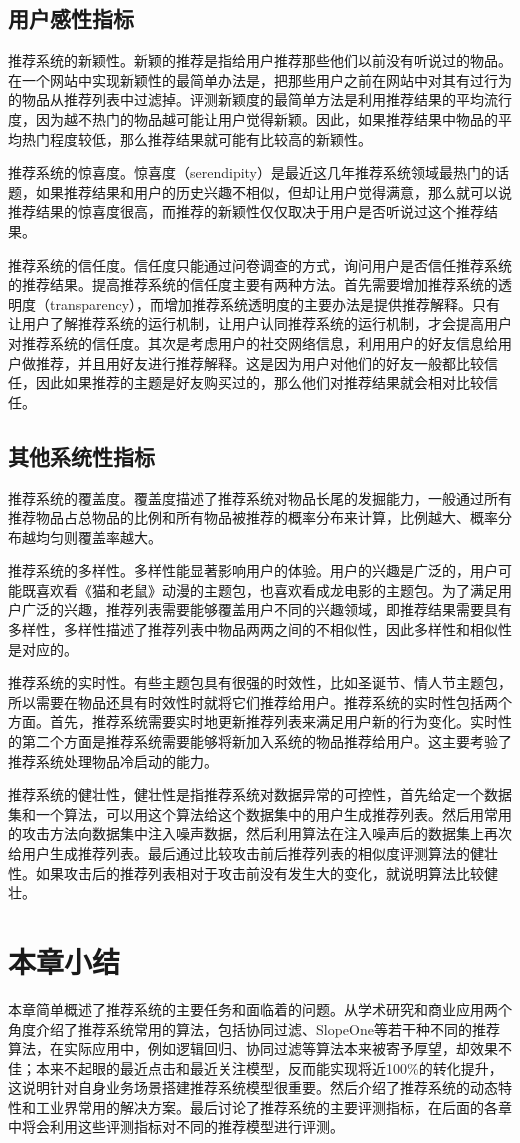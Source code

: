 		\subsection{用户感性指标}
			推荐系统的新颖性。新颖的推荐是指给用户推荐那些他们以前没有听说过的物品。在一个网站中实现新颖性的最简单办法是，把那些用户之前在网站中对其有过行为的物品从推荐列表中过滤掉。评测新颖度的最简单方法是利用推荐结果的平均流行度，因为越不热门的物品越可能让用户觉得新颖。因此，如果推荐结果中物品的平均热门程度较低，那么推荐结果就可能有比较高的新颖性。

			推荐系统的惊喜度。惊喜度（serendipity）是最近这几年推荐系统领域最热门的话题，如果推荐结果和用户的历史兴趣不相似，但却让用户觉得满意，那么就可以说推荐结果的惊喜度很高，而推荐的新颖性仅仅取决于用户是否听说过这个推荐结果。

			推荐系统的信任度。信任度只能通过问卷调查的方式，询问用户是否信任推荐系统的推荐结果。提高推荐系统的信任度主要有两种方法。首先需要增加推荐系统的透明度（transparency），而增加推荐系统透明度的主要办法是提供推荐解释。只有让用户了解推荐系统的运行机制，让用户认同推荐系统的运行机制，才会提高用户对推荐系统的信任度。其次是考虑用户的社交网络信息，利用用户的好友信息给用户做推荐，并且用好友进行推荐解释。这是因为用户对他们的好友一般都比较信任，因此如果推荐的主题是好友购买过的，那么他们对推荐结果就会相对比较信任。

		\subsection{其他系统性指标}
			推荐系统的覆盖度。覆盖度描述了推荐系统对物品长尾的发掘能力，一般通过所有推荐物品占总物品的比例和所有物品被推荐的概率分布来计算，比例越大、概率分布越均匀则覆盖率越大。

			推荐系统的多样性。多样性能显著影响用户的体验。用户的兴趣是广泛的，用户可能既喜欢看《猫和老鼠》动漫的主题包，也喜欢看成龙电影的主题包。为了满足用户广泛的兴趣，推荐列表需要能够覆盖用户不同的兴趣领域，即推荐结果需要具有多样性，多样性描述了推荐列表中物品两两之间的不相似性，因此多样性和相似性是对应的。

			推荐系统的实时性。有些主题包具有很强的时效性，比如圣诞节、情人节主题包，所以需要在物品还具有时效性时就将它们推荐给用户。推荐系统的实时性包括两个方面。首先，推荐系统需要实时地更新推荐列表来满足用户新的行为变化。实时性的第二个方面是推荐系统需要能够将新加入系统的物品推荐给用户。这主要考验了推荐系统处理物品冷启动的能力。

			推荐系统的健壮性，健壮性是指推荐系统对数据异常的可控性，首先给定一个数据集和一个算法，可以用这个算法给这个数据集中的用户生成推荐列表。然后用常用的攻击方法向数据集中注入噪声数据，然后利用算法在注入噪声后的数据集上再次给用户生成推荐列表。最后通过比较攻击前后推荐列表的相似度评测算法的健壮性。如果攻击后的推荐列表相对于攻击前没有发生大的变化，就说明算法比较健壮。

	\section{本章小结}
	本章简单概述了推荐系统的主要任务和面临着的问题。从学术研究和商业应用两个角度介绍了推荐系统常用的算法，包括协同过滤、SlopeOne等若干种不同的推荐算法，在实际应用中，例如逻辑回归、协同过滤等算法本来被寄予厚望，却效果不佳；本来不起眼的最近点击和最近关注模型，反而能实现将近100\%的转化提升，这说明针对自身业务场景搭建推荐系统模型很重要。然后介绍了推荐系统的动态特性和工业界常用的解决方案。最后讨论了推荐系统的主要评测指标，在后面的各章中将会利用这些评测指标对不同的推荐模型进行评测。